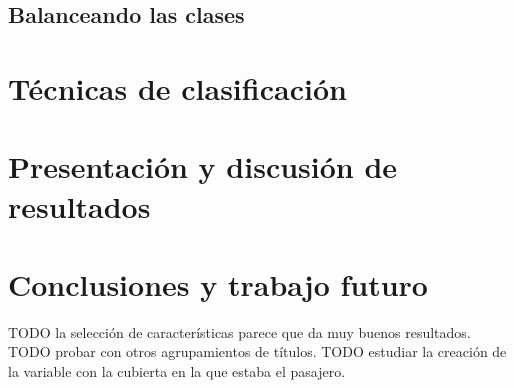 \documentclass[10pt,a4paper]{article}
\begin{document}
\subsection{Balanceando las clases}

\section{Técnicas de clasificación}

\section{Presentación y discusión de resultados}

\section{Conclusiones y trabajo futuro}

TODO la selección de características parece que da muy buenos resultados.
TODO probar con otros agrupamientos de títulos.
TODO estudiar la creación de la variable con la cubierta en la que estaba el pasajero.
\end{document}
